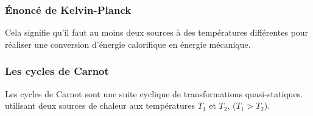 \documentclass[12pt,oneside]{book}
\begin{document}
\subsubsection{Énoncé de Kelvin-Planck}
\begin{center}\end{center}
Cela signifie qu'il faut au moins deux sources à des températures différentes pour réaliser une conversion d'énergie calorifique en énergie mécanique.
\subsubsection{Les cycles de Carnot}
Les cycles de Carnot sont une suite cyclique de transformations quasi-statiques.\\
utilisant deux sources de chaleur aux températures $T_1$ et $T_2$, ($T_1 > T_2$).
\end{document}
